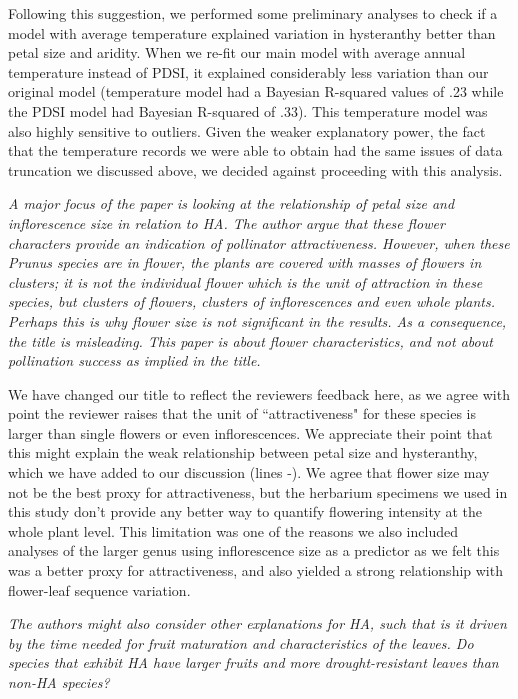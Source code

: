 \documentclass{article}[12pt]
\begin{document}
Following this suggestion, we performed some preliminary analyses to check if a model with average temperature explained variation in hysteranthy better than petal size and aridity. When we re-fit our main model with average annual temperature instead of PDSI, it explained considerably less variation than our original model (temperature model had a Bayesian R-squared values of .23 while the PDSI model had Bayesian R-squared of .33). This temperature model was also highly sensitive to outliers. Given the weaker explanatory power, the fact that the temperature records we were able to obtain had the same issues of data truncation we discussed above, we decided against proceeding with this analysis.


\emph{A major focus of the paper is looking at the relationship of petal size and inflorescence size in relation to HA. The author argue that these flower characters provide an indication of pollinator attractiveness. However, when these Prunus species are in flower, the plants are covered with masses of flowers in clusters; it is not the individual flower which is the unit of attraction in these species, but clusters of flowers, clusters of inflorescences and even whole plants. Perhaps this is why flower size is not significant in the results.
As a consequence, the title is misleading. This paper is about flower characteristics, and not about pollination success as implied in the title.}

We have changed our title to reflect the reviewers feedback here, as we agree with point the reviewer raises that the unit of ``attractiveness" for these species is larger than single flowers or even inflorescences. We appreciate their point that this might explain the weak relationship between petal size and hysteranthy, which we have added to our discussion (lines -). We agree that flower size may not be the best proxy for attractiveness, but the herbarium specimens we used in this study don't provide any better way to quantify flowering intensity at the whole plant level. This limitation was one of the reasons we also included analyses of the larger genus using inflorescence size as a predictor as we felt this was a better proxy for attractiveness, and also yielded a strong relationship with flower-leaf sequence variation. 

\emph{The authors might also consider other explanations for HA, such that is it driven by the time needed for fruit maturation and characteristics of the leaves. Do species that exhibit HA have larger fruits and more drought-resistant leaves than non-HA species?}
\end{document}
